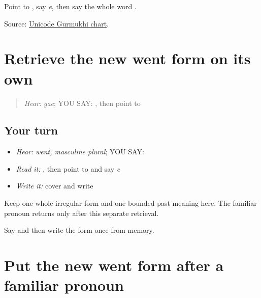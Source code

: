 \begin{tcolorbox}[breakable,colback=teal!4,colframe=teal!35!black,title={Before you move on}]
Point to \textbf{}, say \emph{e}, then say the whole word \textbf{}.

Source: \href{https://www.unicode.org/charts/PDF/U0A00.pdf}{Unicode Gurmukhi chart}.
\end{tcolorbox}
\section[\texorpdfstring{\pa{ਗਏ} (gae)}{ਗਏ (gae)}]{Retrieve the new went form on its own}

\label{lesson:PA-C206-gae-review}



\begin{quote}
\emph{Hear:} \emph{gae}; YOU SAY: \textbf{}, then point to \textbf{}
\end{quote}

\subsection*{Your turn}
\begin{itemize}
\raggedright
  \item \emph{Hear:} \emph{went, masculine plural}; YOU SAY: \textbf{}
  \item \emph{Read it:} \textbf{}, then point to \textbf{} and say \emph{e}
  \item \emph{Write it:} cover and write \textbf{}
\end{itemize}

\begin{grammarlens}[title={Grammar Lens}]
Keep one whole irregular form and one bounded past meaning here. The familiar pronoun returns only after this separate retrieval.
\end{grammarlens}

\begin{tcolorbox}[breakable,colback=teal!4,colframe=teal!35!black,title={Before you move on}]
Say and then write the form once from memory.
\end{tcolorbox}
\section[\texorpdfstring{\pa{ਉਹ} \pa{ਗਏ} (oh gae)}{ਉਹ ਗਏ (oh gae)}]{Put the new went form after a familiar pronoun}

\label{lesson:PA-C206-they-went}



